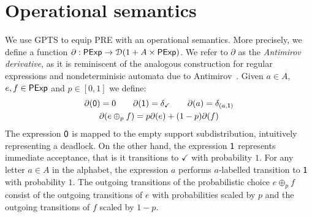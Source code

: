 	\section{Operational semantics}
	We use {GPTS} to equip {PRE} with an operational semantics. More precisely, we define a function $\partial : \mathsf{PExp} \to \mathcal{D} (1+A\times \mathsf{PExp})$. We refer to $\partial$ as the \emph{Antimirov derivative}, as it is reminiscent of the analogous construction
for regular expressions and nondeterminisic automata due to Antimirov~\cite{Antimirov:1996:Partial}. Given $a \in A$, $e,f \in \mathsf{PExp}$ and $p \in [0,1]$ we define:
\begin{gather*}
    \partial(\mathsf{0}) = 0 \quad\quad \partial(\mathsf{1})=\delta_{\checkmark} \quad\quad \partial(a)=\delta_{(a,\mathsf{1})}  \\  \partial(e \oplus_p f)=p\partial(e) + (1-p)\partial(f)
\end{gather*}
The expression $\mathsf{0}$ is mapped to the empty support subdistribution, intuitively representing a deadlock. On the other hand, the expression $\mathsf{1}$ represents immediate acceptance, that is it transitions to $\checkmark$ with probability $1$. For any letter $a \in A$ in the alphabet, the expression $a$ performs $a$-labelled transition to $\mathsf{1}$ with probability $1$. The outgoing transitions of the probabilistic choice $e \oplus_p f$ consist of the outgoing transitions of $e$ with
probabilities scaled by $p$ and the outgoing transitions of $f$ scaled by $1-p$.

